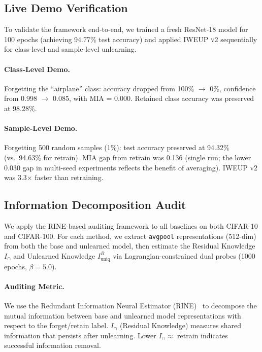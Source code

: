 \documentclass[11pt]{article}
\newcommand{\method}{\textsc{IWEUP v2}}
\begin{document}
\subsection{Live Demo Verification}

To validate the framework end-to-end, we trained a fresh ResNet-18 model for 100 epochs (achieving 94.77\% test accuracy) and applied \method{} sequentially for class-level and sample-level unlearning.

\paragraph{Class-Level Demo.}
Forgetting the ``airplane'' class: accuracy dropped from 100\% $\rightarrow$ 0\%, confidence from 0.998 $\rightarrow$ 0.085, with MIA = 0.000. Retained class accuracy was preserved at 98.28\%.

\paragraph{Sample-Level Demo.}
Forgetting 500 random samples (1\%): test accuracy preserved at 94.32\% (vs.\ 94.63\% for retrain). MIA gap from retrain was 0.136 (single run; the lower 0.030 gap in multi-seed experiments reflects the benefit of averaging). \method{} was 3.3$\times$ faster than retraining.

\subsection{Information Decomposition Audit}
\label{sec:audit}

We apply the RINE-based auditing framework to all baselines on both CIFAR-10 and CIFAR-100. For each method, we extract \texttt{avgpool} representations (512-dim) from both the base and unlearned model, then estimate the Residual Knowledge $I_\cap$ and Unlearned Knowledge $I^B_{\text{uniq}}$ via Lagrangian-constrained dual probes (1000 epochs, $\beta = 5.0$).

\paragraph{Auditing Metric.}
We use the Redundant Information Neural Estimator (RINE)~\citep{mazzetto2025auditing} to decompose the mutual information between base and unlearned model representations with respect to the forget/retain label. $I_\cap$ (Residual Knowledge) measures shared information that persists after unlearning. Lower $I_\cap \approx$ retrain indicates successful information removal.
\end{document}
